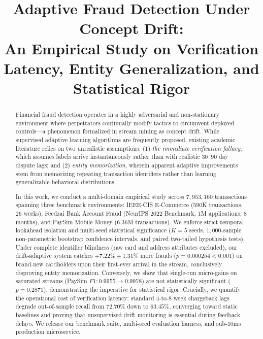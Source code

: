\documentclass[10pt,conference,compsoc]{IEEEtran}
\begin{document}
\title{Adaptive Fraud Detection Under Concept Drift:\\An Empirical Study on Verification Latency, Entity Generalization, and Statistical Rigor}

\author{
}

\maketitle

\begin{abstract}
Financial fraud detection operates in a highly adversarial and non-stationary environment where perpetrators continually modify tactics to circumvent deployed controls—a phenomenon formalized in stream mining as concept drift. While supervised adaptive learning algorithms are frequently proposed, existing academic literature relies on two unrealistic assumptions: (1) \textit{the immediate verification fallacy}, which assumes labels arrive instantaneously rather than with realistic 30--90 day dispute lags; and (2) \textit{entity memorization}, wherein apparent adaptive improvements stem from memorizing repeating transaction identifiers rather than learning generalizable behavioral distributions. 

In this work, we conduct a multi-domain empirical study across $7,953,160$ transactions spanning three benchmark environments: IEEE-CIS E-Commerce ($590$K transactions, $26$ weeks), Feedzai Bank Account Fraud (NeurIPS 2022 Benchmark, $1$M applications, $8$ months), and PaySim Mobile Money ($6.36$M transactions). We enforce strict temporal lookahead isolation and multi-seed statistical significance ($K=5$ seeds, $1{,}000$-sample non-parametric bootstrap confidence intervals, and paired two-tailed hypothesis tests). Under complete identifier blindness (raw card and address attributes excluded), our drift-adaptive system catches $+7.22\% \pm 1.31\%$ more frauds ($p = 0.000254 < 0.001$) on brand-new cardholders upon their first-ever arrival in the stream, conclusively disproving entity memorization. Conversely, we show that single-run micro-gains on saturated streams (PaySim $F1: 0.9955 \to 0.9978$) are not statistically significant ($p = 0.2871$), demonstrating the imperative for statistical rigor. Crucially, we quantify the operational cost of verification latency: standard 4-to-8 week chargeback lags degrade out-of-sample recall from $72.70\%$ down to $63.45\%$, converging toward static baselines and proving that unsupervised drift monitoring is essential during feedback delays. We release our benchmark suite, multi-seed evaluation harness, and sub-$10$ms production microservice.
\end{abstract}
\end{document}

